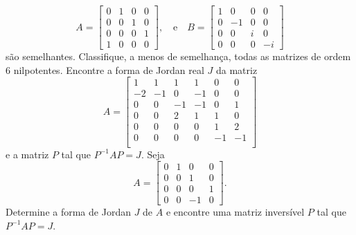 \documentclass[11pt,a4paper]{article}
\begin{document}
\[
A  =\begin{bmatrix}
0 & 1 & 0 & 0\\
0 & 0 & 1 & 0 \\
0 & 0 & 0 & 1 \\
1 & 0 & 0 & 0
\end{bmatrix}, \quad \mbox{e} \quad B  =\begin{bmatrix}
1 & 0 & 0& 0\\
0 &-1 &0 & 0 \\
0 &0 & i& 0 \\
0 & 0 & 0 & -i
\end{bmatrix}
\]
são semelhantes.
                 \solucao{}
     Classifique, a menos de semelhança, todas as matrizes de ordem $6$ nilpotentes.
                 \solucao{}
     Encontre a forma de Jordan real $J$ da matriz    
 \[
 A = \begin{bmatrix}
1 & 1 & 1 & 1 & 0 & 0\\
-2 & -1 & 0 & -1 & 0 & 0\\
0 & 0 & -1 & -1 & 0 & 1\\
0 & 0 &  2 & 1 & 1 & 0\\
0 &0 & 0 & 0 & 1 & 2\\
0& 0 & 0 & 0 & -1 & -1\\
\end{bmatrix}
 \]
e a matriz $P$ tal que $P^{
-1}AP = J.$
                 \solucao{}
     Seja
\[
A  =\begin{bmatrix}
0 & 1 & 0& 0\\
0 &0 &1 & 0 \\
0 &0 &0& 1 \\
0 & 0 & -1&0
\end{bmatrix}.
\]
Determine a forma de Jordan $J$ de $A$ e encontre uma matriz inversível $P$ tal que $P^{-1}AP = J.$
\end{document}
